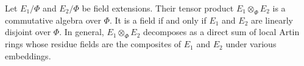 Let $E_1/\Phi$ and $E_2/\Phi$ be field extensions. Their tensor product $E_1 \otimes_\Phi E_2$ is a commutative algebra over $\Phi$. It is a field if and only if $E_1$ and $E_2$ are linearly disjoint over $\Phi$. In general, $E_1 \otimes_\Phi E_2$ decomposes as a direct sum of local Artin rings whose residue fields are the composites of $E_1$ and $E_2$ under various embeddings.
